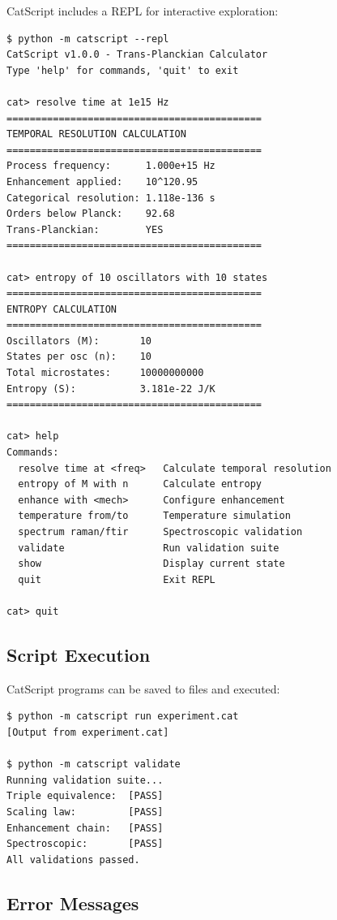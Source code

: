\documentclass[twocolumn,10pt]{article}
\begin{document}
CatScript includes a REPL for interactive exploration:

\begin{verbatim}
$ python -m catscript --repl
CatScript v1.0.0 - Trans-Planckian Calculator
Type 'help' for commands, 'quit' to exit

cat> resolve time at 1e15 Hz
============================================
TEMPORAL RESOLUTION CALCULATION
============================================
Process frequency:      1.000e+15 Hz
Enhancement applied:    10^120.95
Categorical resolution: 1.118e-136 s
Orders below Planck:    92.68
Trans-Planckian:        YES
============================================

cat> entropy of 10 oscillators with 10 states
============================================
ENTROPY CALCULATION
============================================
Oscillators (M):       10
States per osc (n):    10
Total microstates:     10000000000
Entropy (S):           3.181e-22 J/K
============================================

cat> help
Commands:
  resolve time at <freq>   Calculate temporal resolution
  entropy of M with n      Calculate entropy
  enhance with <mech>      Configure enhancement
  temperature from/to      Temperature simulation
  spectrum raman/ftir      Spectroscopic validation
  validate                 Run validation suite
  show                     Display current state
  quit                     Exit REPL

cat> quit
\end{verbatim}

\subsection{Script Execution}

CatScript programs can be saved to files and executed:

\begin{verbatim}
$ python -m catscript run experiment.cat
[Output from experiment.cat]

$ python -m catscript validate
Running validation suite...
Triple equivalence:  [PASS]
Scaling law:         [PASS]
Enhancement chain:   [PASS]
Spectroscopic:       [PASS]
All validations passed.
\end{verbatim}

\subsection{Error Messages}
\end{document}
